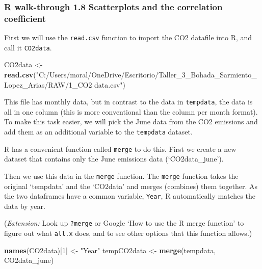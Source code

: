 \documentclass[
]{article}
\newenvironment{Shaded}{\begin{snugshade}}{\end{snugshade}}
\newcommand{\DecValTok}[1]{\textcolor[rgb]{0.00,0.00,0.81}{#1}}
\newcommand{\FunctionTok}[1]{\textcolor[rgb]{0.13,0.29,0.53}{\textbf{#1}}}
\newcommand{\NormalTok}[1]{#1}
\newcommand{\OtherTok}[1]{\textcolor[rgb]{0.56,0.35,0.01}{#1}}
\newcommand{\SpecialCharTok}[1]{\textcolor[rgb]{0.81,0.36,0.00}{\textbf{#1}}}
\newcommand{\StringTok}[1]{\textcolor[rgb]{0.31,0.60,0.02}{#1}}
\begin{document}
\subsubsection{R walk-through 1.8 Scatterplots and the correlation
coefficient}\label{r-walk-through-1.8-scatterplots-and-the-correlation-coefficient}

First we will use the \texttt{read.csv} function to import the CO2
datafile into R, and call it \texttt{CO2data}.

\begin{Shaded}
\begin{Highlighting}[]
\NormalTok{CO2data }\OtherTok{\textless{}{-}} \FunctionTok{read.csv}\NormalTok{(}\StringTok{"C:/Users/moral/OneDrive/Escritorio/Taller\_3\_Bohada\_Sarmiento\_Lopez\_Arias/RAW/1\_CO2 data.csv"}\NormalTok{)}
\end{Highlighting}
\end{Shaded}

This file has monthly data, but in contrast to the data in
\texttt{tempdata}, the data is all in one column (this is more
conventional than the column per month format). To make this task
easier, we will pick the June data from the CO2 emissions and add them
as an additional variable to the \texttt{tempdata} dataset.

R has a convenient function called \texttt{merge} to do this. First we
create a new dataset that contains only the June emissions data
(`CO2data\_june').

\begin{Shaded}
\end{Shaded}

Then we use this data in the \texttt{merge} function. The \texttt{merge}
function takes the original `tempdata' and the `CO2data' and merges
(combines) them together. As the two dataframes have a common variable,
\texttt{Year}, R automatically matches the data by year.

(\emph{Extension:} Look up \texttt{?merge} or Google `How to use the R
merge function' to figure out what \texttt{all.x} does, and to see other
options that this function allows.)

\begin{Shaded}
\begin{Highlighting}[]
\FunctionTok{names}\NormalTok{(CO2data)[}\DecValTok{1}\NormalTok{] }\OtherTok{\textless{}{-}} \StringTok{"Year"}
\NormalTok{tempCO2data }\OtherTok{\textless{}{-}} \FunctionTok{merge}\NormalTok{(tempdata, CO2data\_june)}
\end{Highlighting}
\end{Shaded}
\end{document}
